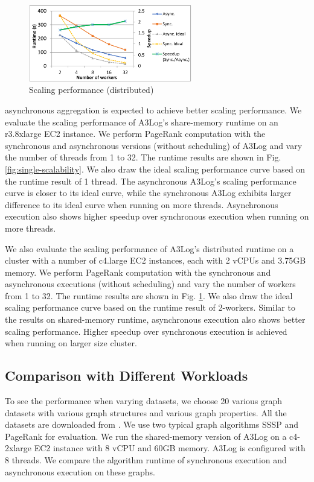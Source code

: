  \begin{figure}[!t]
 	\centering
 	\includegraphics[width=2.8in]{fig/dist-scalability}
 	\vspace{-0.1in}
 	\caption{Scaling performance (distributed)}
 	\label{fig:dist-scalability}
 \end{figure}
 
 
asynchronous aggregation is expected to achieve better scaling performance. We evaluate the scaling performance of A3Log's share-memory runtime on an r3.8xlarge EC2 instance. We perform PageRank computation with the synchronous and asynchronous versions (without scheduling) of A3Log and vary the number of threads from 1 to 32. The runtime results are shown in Fig. \ref{fig:single-scalability}. We also draw the ideal scaling performance curve based on the runtime result of 1 thread. The asynchronous A3Log's scaling performance curve is closer to its ideal curve, while the synchronous A3Log exhibits larger difference to its ideal curve when running on more threads. Asynchronous execution also shows higher speedup over synchronous execution when running on more threads.
 
 We also evaluate the scaling performance of A3Log's distributed runtime on a cluster with a number of c4.large EC2 instances, each with 2 vCPUs and 3.75GB memory. We perform PageRank computation with the synchronous and asynchronous executions (without scheduling) and vary the number of workers from 1 to 32. The runtime results are shown in Fig. \ref{fig:dist-scalability}. We also draw the ideal scaling performance curve based on the runtime result of 2-workers. Similar to the results on shared-memory runtime, asynchronous execution also shows better scaling performance. Higher speedup over synchronous execution is achieved when running on larger size cluster.


\subsection{Comparison with Different Workloads}
\label{sec:expr:workloads}
To see the performance when varying datasets, we choose 20 various graph datasets with various graph structures and various graph properties. All the datasets are downloaded from \cite{konect}. We use two typical graph algorithms SSSP and PageRank for evaluation. We run the shared-memory version of A3Log on a c4-2xlarge EC2 instance with 8 vCPU and 60GB memory. A3Log is configured with 8 threads. We compare the algorithm runtime of synchronous execution and asynchronous execution on these graphs.

